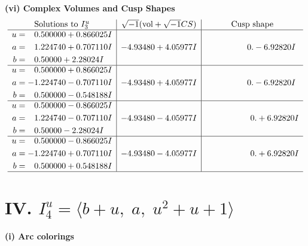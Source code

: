 \documentclass[1p]{elsarticle_modified}
\theoremstyle{definition}
\newcommand{\I}{\sqrt{-1}}
\begin{document}
\newpage\flushleft \textbf{(vi) Complex Volumes and Cusp Shapes}
$$\begin{array}{c|c|c}  
\text{Solutions to }I^u_{3}& \I (\text{vol} + \sqrt{-1}CS) & \text{Cusp shape}\\
 \hline 
\begin{aligned}
u &= \phantom{-}0.500000 + 0.866025 I \\
a &= \phantom{-}1.224740 + 0.707110 I \\
b &= \phantom{-}0.50000 + 2.28024 I\end{aligned}
 & -4.93480 + 4.05977 I & \phantom{-0.000000 } 0. - 6.92820 I \\ \hline\begin{aligned}
u &= \phantom{-}0.500000 + 0.866025 I \\
a &= -1.224740 - 0.707110 I \\
b &= \phantom{-}0.500000 - 0.548188 I\end{aligned}
 & -4.93480 + 4.05977 I & \phantom{-0.000000 } 0. - 6.92820 I \\ \hline\begin{aligned}
u &= \phantom{-}0.500000 - 0.866025 I \\
a &= \phantom{-}1.224740 - 0.707110 I \\
b &= \phantom{-}0.50000 - 2.28024 I\end{aligned}
 & -4.93480 - 4.05977 I & \phantom{-0.000000 -}0. + 6.92820 I \\ \hline\begin{aligned}
u &= \phantom{-}0.500000 - 0.866025 I \\
a &= -1.224740 + 0.707110 I \\
b &= \phantom{-}0.500000 + 0.548188 I\end{aligned}
 & -4.93480 - 4.05977 I & \phantom{-0.000000 -}0. + 6.92820 I\\
 \hline 
 \end{array}$$\newpage\newpage\renewcommand{\arraystretch}{1}
\centering \section*{IV. $I^u_{4}= \langle b+u,\;a,\;u^2+u+1 \rangle$}
\flushleft \textbf{(i) Arc colorings}\\
\end{document}
